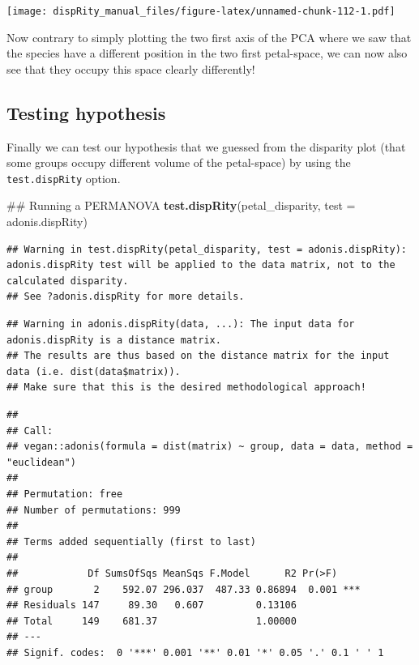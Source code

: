 \documentclass[]{book}
\newenvironment{Shaded}{\begin{snugshade}}{\end{snugshade}}
\newcommand{\KeywordTok}[1]{\textcolor[rgb]{0.13,0.29,0.53}{\textbf{#1}}}
\newcommand{\DataTypeTok}[1]{\textcolor[rgb]{0.13,0.29,0.53}{#1}}
\newcommand{\NormalTok}[1]{#1}
\theoremstyle{definition}
\theoremstyle{definition}
\theoremstyle{remark}
\begin{document}
\texttt{[image: dispRity\_manual\_files/figure-latex/unnamed-chunk-112-1.pdf]}

Now contrary to simply plotting the two first axis of the PCA where we
saw that the species have a different position in the two first
petal-space, we can now also see that they occupy this space clearly
differently!

\subsection{Testing hypothesis}\label{testing-hypothesis}

Finally we can test our hypothesis that we guessed from the disparity
plot (that some groups occupy different volume of the petal-space) by
using the \texttt{test.dispRity} option.

\begin{Shaded}
\begin{Highlighting}[]
\NormalTok{## Running a PERMANOVA}
\KeywordTok{test.dispRity}\NormalTok{(petal_disparity, }\DataTypeTok{test =}\NormalTok{ adonis.dispRity)}
\end{Highlighting}
\end{Shaded}

\begin{verbatim}
## Warning in test.dispRity(petal_disparity, test = adonis.dispRity): adonis.dispRity test will be applied to the data matrix, not to the calculated disparity.
## See ?adonis.dispRity for more details.
\end{verbatim}

\begin{verbatim}
## Warning in adonis.dispRity(data, ...): The input data for adonis.dispRity is a distance matrix.
## The results are thus based on the distance matrix for the input data (i.e. dist(data$matrix)).
## Make sure that this is the desired methodological approach!
\end{verbatim}

\begin{verbatim}
## 
## Call:
## vegan::adonis(formula = dist(matrix) ~ group, data = data, method = "euclidean") 
## 
## Permutation: free
## Number of permutations: 999
## 
## Terms added sequentially (first to last)
## 
##            Df SumsOfSqs MeanSqs F.Model      R2 Pr(>F)    
## group       2    592.07 296.037  487.33 0.86894  0.001 ***
## Residuals 147     89.30   0.607         0.13106           
## Total     149    681.37                 1.00000           
## ---
## Signif. codes:  0 '***' 0.001 '**' 0.01 '*' 0.05 '.' 0.1 ' ' 1
\end{verbatim}
\end{document}
